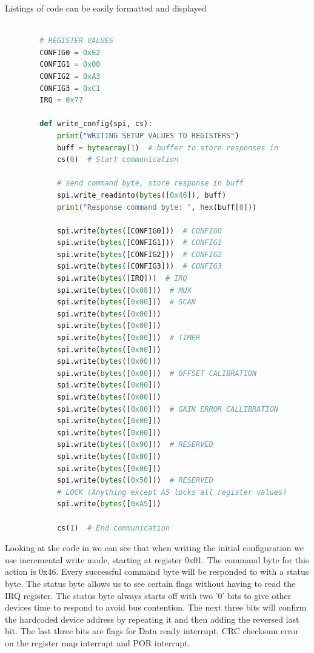       \begin{frame}[fragile]{Listings of code can be easily formatted and displayed}
        \begin{lstlisting}[language=Python, caption={write\textunderscore config function},label={list: write config}]

        # REGISTER VALUES
        CONFIG0 = 0xE2
        CONFIG1 = 0x00
        CONFIG2 = 0xA3
        CONFIG3 = 0xC1
        IRQ = 0x77
        
        def write_config(spi, cs):
            print("WRITING SETUP VALUES TO REGISTERS")
            buff = bytearray(1)  # buffer to store responses in
            cs(0)  # Start communication

            # send command byte, store response in buff
            spi.write_readinto(bytes([0x46]), buff)
            print("Response command byte: ", hex(buff[0]))
        
            spi.write(bytes([CONFIG0]))  # CONFIG0
            spi.write(bytes([CONFIG1]))  # CONFIG1
            spi.write(bytes([CONFIG2]))  # CONFIG2
            spi.write(bytes([CONFIG3]))  # CONFIG3
            spi.write(bytes([IRQ]))  # IRQ
            spi.write(bytes([0x08]))  # MUX
            spi.write(bytes([0x00]))  # SCAN
            spi.write(bytes([0x00]))
            spi.write(bytes([0x00]))
            spi.write(bytes([0x00]))  # TIMER
            spi.write(bytes([0x00]))
            spi.write(bytes([0x00]))
            spi.write(bytes([0x00]))  # OFFSET CALIBRATION
            spi.write(bytes([0x00]))
            spi.write(bytes([0x00]))
            spi.write(bytes([0x80]))  # GAIN ERROR CALLIBRATION
            spi.write(bytes([0x00]))
            spi.write(bytes([0x00]))
            spi.write(bytes([0x90]))  # RESERVED
            spi.write(bytes([0x00]))
            spi.write(bytes([0x00]))
            spi.write(bytes([0x50]))  # RESERVED
            # LOCK (Anything except A5 locks all register values)
            spi.write(bytes([0xA5]))
        
            cs(1)  # End communication

        \end{lstlisting}
    \end{frame}

      Looking at the code in  we can see that when writing the initial configuration we use incremental write mode, starting at register 0x01. The command byte for this action is 0x46.
      Every successful command byte will be responded to with a status byte. The status byte allows us to see certain flags without having to read the IRQ register. The status byte always starts off with two '0' bits to give other devices time to respond to avoid bus contention. The next three bits will confirm the hardcoded device address by repeating it and then adding the reversed last bit. The last three bits are flags for Data ready interrupt, CRC checksum error on the register map interrupt and POR interrupt.

